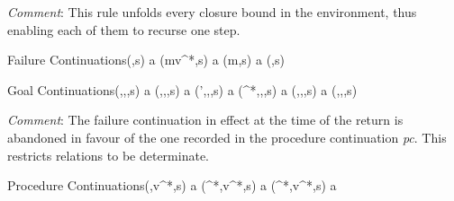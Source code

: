 \par\noindent\emph{Comment}: This rule unfolds every closure bound
in the environment, thus enabling each of them to recurse one step.

\begin{relation}{Failure Continuations}{(,s) \Rightarrow a}
	{(m\mtt{,}\mtt{,}v^{*}\mtt{,}\ME\mtt{,}\VE\mtt{,}\mtt{,}\mtt{)},s) \Rightarrow a}
\rruleskip
{}
	{(m\mtt{,}\mtt{,}\VE\mtt{,}\mtt{)},s) \Rightarrow a}
\rruleskip
\rrule	{}
	{(,s) \Rightarrow {}}
\end{relation}

\begin{relation}{Goal Continuations}{(,\VE,,s) \Rightarrow a}
	{(\mtt{,}\ME\mtt{,}\mtt{)},\VE,,s) \Rightarrow a}
\rruleskip
{}
	{('\mtt{)},\VE,,s) \Rightarrow a}
\rruleskip
{}
	{(\ME\mtt{,}^{*}\mtt{,}\mtt{)},\VE,\rmunder,s) \Rightarrow a}
\rruleskip
{}
	{(\ME\mtt{,}\mtt{,}\mtt{)},\VE,\rmunder,s) \Rightarrow a}
\rruleskip
\rrule	{}
	{(,\VE,,s) \Rightarrow {}}
\end{relation}

\par\noindent\emph{Comment}:  The failure continuation in
effect at the time of the return is abandoned in favour of the one recorded
in the procedure continuation \emph{pc}.
This restricts relations to be determinate.

\begin{relation}{Procedure Continuations}{(,v^{*},s) \Rightarrow a}
	{(^{*}\mtt{,}\VE\mtt{,}\mtt{,}\mtt{)},v^{*},s) \Rightarrow a}
\rruleskip
{}
	{(^{*}\mtt{,}\VE\mtt{,}\mtt{,}\mtt{)},v^{*},s) \Rightarrow a}
\end{relation}

